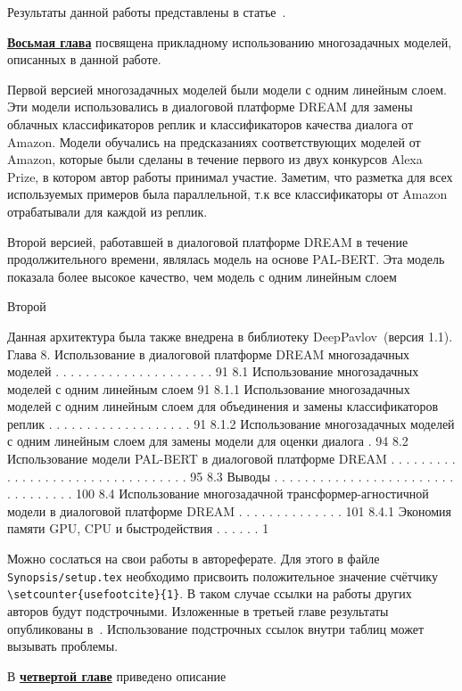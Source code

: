 Результаты данной работы представлены в статье~\cite{rutopics}.

\underline{\textbf{Восьмая глава}} посвящена прикладному использованию многозадачных моделей, описанных в данной работе.

Первой версией многозадачных моделей были модели с одним линейным слоем. Эти модели использовались в диалоговой платформе DREAM для замены облачных классификаторов реплик и классификаторов качества диалога от Amazon. Модели обучались на предсказаниях соответствующих моделей от Amazon, которые были сделаны в течение первого из двух конкурсов Alexa Prize, в котором автор работы принимал участие. Заметим, что разметка для всех используемых примеров была параллельной, т.к все классификаторы от Amazon отрабатывали для каждой из реплик.

Второй версией, работавшей в диалоговой платформе DREAM в течение продолжительного времени, являлась модель на основе PAL-BERT. Эта модель показала более высокое качество, чем модель с одним линейным слоем

Второй

Данная архитектура была также внедрена в библиотеку DeepPavlov~\cite{dp_2023}(версия 1.1).
Глава 8. Использование в диалоговой платформе DREAM
многозадачных моделей . . . . . . . . . . . . . . . . . . . . . 91
8.1 Использование многозадачных моделей с одним линейным слоем 91
8.1.1 Использование многозадачных моделей с одним
линейным слоем для объединения и замены
классификаторов реплик . . . . . . . . . . . . . . . . . . . 91
8.1.2 Использование многозадачных моделей с одним
линейным слоем для замены модели для оценки диалога . 94
8.2 Использование модели PAL-BERT в диалоговой платформе
DREAM . . . . . . . . . . . . . . . . . . . . . . . . . . . . . . . . . 95
8.3 Выводы . . . . . . . . . . . . . . . . . . . . . . . . . . . . . . . . . 100
8.4 Использование многозадачной трансформер-агностичной
модели в диалоговой платформе DREAM . . . . . . . . . . . . . . 101
8.4.1 Экономия памяти GPU, CPU и быстродействия . . . . . . 1

Можно сослаться на свои работы в автореферате. Для этого в файле
\verb!Synopsis/setup.tex! необходимо присвоить положительное значение
счётчику \verb!\setcounter{usefootcite}{1}!. В таком случае ссылки на
работы других авторов будут подстрочными.
Изложенные в третьей главе результаты опубликованы в~\cite{vakbib1, vakbib2}.
Использование подстрочных ссылок внутри таблиц может вызывать проблемы.

В \underline{\textbf{четвертой главе}} приведено описание

